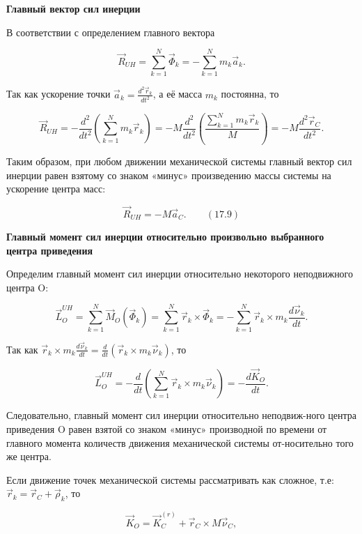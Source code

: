 {\begin{center}
	  \par\textbf{Главный вектор сил инерции}

	  \par В соответствии с определением главного вектора

	  $$ \vec R_{UH} = \sum\limits_{k=1}^N \vec\Phi_k = - \sum\limits_{k=1}^N m_k \vec a_k.$$

	  \par Так как ускорение точки $ \vec a_k = \frac{d^2 \vec r_k}{d t^2}$, а её масса $m_k$ постоянна, то

	  $$ \vec R_{UH} = -\frac{d^2}{d t^2} (\sum\limits_{k=1}^N m_k \vec r_k) = -M \frac{d^2}{d t^2} (\frac{\sum\limits_{k=1}^N m_k \vec r_k}{M}) = -M \frac{d^2 \vec r_C}{d t^2}.$$

	  \par Таким  образом,  при  любом  движении  механической  системы  главный вектор сил инерции равен взятому со знаком «минус» произведению массы системы на ускорение центра масс:

	  $$ \vec R_{UH} = -M \vec a_C. \qquad (17.9)$$

	  \par\textbf{Главный момент сил инерции относительно произвольно выбранного центра приведения}

	  \par Определим главный момент сил инерции относительно некоторого неподвижного центра O:

	  $$ \vec L_O^{UH} = \sum\limits_{k=1}^N \vec M_O (\vec\Phi_k) = \sum\limits_{k=1}^N \vec r_k \times \vec\Phi_k = -\sum\limits_{k=1}^N \vec r_k \times m_k \frac{d \vec\nu_k}{dt}.$$
	  
	  \par Так как $\vec r_k \times m_k \frac{d \vec\nu_k}{dt} = \frac{d}{dt} (\vec r_k \times m_k \vec\nu_k)$, то

	  $$ \vec L_O^{UH} = -\frac{d}{dt} (\sum\limits_{k=1}^N \vec r_k \times m_k \vec\nu_k) = -\frac{d \vec K_O}{dt}.$$

	  \par Следовательно, главный момент сил  инерции относительно неподвиж-ного центра приведения O равен взятой со знаком «минус» производной по времени от главного момента количеств движения механической системы от-носительно того же центра.
	  \par Если движение точек механической системы рассматривать как сложное, т.е:$ \vec r_k = \vec r_C + \vec\rho_k$, то

	  $$ \vec K_O = \vec K_C^{(r)} + \vec r_C \times M \vec\nu_C,$$


\end{center}}
